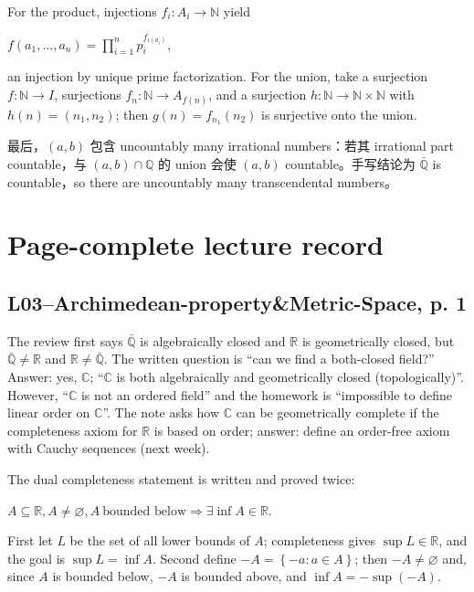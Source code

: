 For the product, injections \(f_{i}:A_{i}\rightarrow\mathbb{N}\) yield

\(f\left( {a_{1},\ldots,a_{n}} \right) = \prod_{i = 1}^{n}p_{i}^{f_{i{(a_{i})}}},\)

an injection by unique prime factorization. For the union, take a surjection \(f:\mathbb{N}\rightarrow I\), surjections \(f_{n}:\mathbb{N}\rightarrow A_{f{(n)}}\), and a surjection \(h:\mathbb{N}\rightarrow\mathbb{N} \times \mathbb{N}\) with \(h(n) = \left( {n_{1},n_{2}} \right)\); then \(g(n) = f_{n_{1}}\left( n_{2} \right)\) is surjective onto the union.

最后，\(\left( {a,b} \right)\) 包含 uncountably many irrational numbers：若其 irrational part countable，与 \(\left( {a,b} \right) \cap \mathbb{Q}\) 的 union 会使 \(\left( {a,b} \right)\) countable。手写结论为 \(\bar{\mathbb{Q}}\) is countable，so there are uncountably many transcendental numbers。

\section{Page-complete lecture record}

\subsection{L03--Archimedean-property\&Metric-Space, p. 1}

The review first says \(\bar{\mathbb{Q}}\) is algebraically closed and \(\mathbb{R}\) is geometrically closed, but \(\bar{\mathbb{Q}} \neq \mathbb{R}\) and \(\mathbb{R} \neq \bar{\mathbb{Q}}\). The written question is ``can we find a both-closed field?'' Answer: yes, \(\mathbb{C}\); ``\(\mathbb{C}\) is both algebraically and geometrically closed (topologically)''. However, ``\(\mathbb{C}\) is not an ordered field'' and the homework is ``impossible to define linear order on \(\mathbb{C}\)''. The note asks how \(\mathbb{C}\) can be geometrically complete if the completeness axiom for \(\mathbb{R}\) is based on order; answer: define an order-free axiom with Cauchy sequences (next week).

The dual completeness statement is written and proved twice:

\(A \subseteq \mathbb{R},A \neq \varnothing,A\ \text{bounded below}\Rightarrow\exists\inf A \in \mathbb{R}.\)

First let \(L\) be the set of all lower bounds of \(A\); completeness gives \(\sup L \in \mathbb{R}\), and the goal is \(\sup L = \inf A\). Second define \(- A = \left\{ {- a:a \in A} \right\}\); then \(- A \neq \varnothing\) and, since \(A\) is bounded below, \(- A\) is bounded above, and \(\inf A = - \sup\left( {- A} \right)\).

